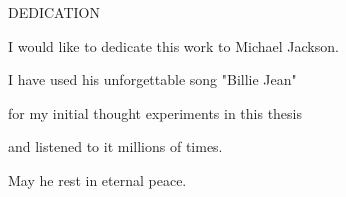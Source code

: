 \newpage
{}

\begin{center}
DEDICATION
\end{center}

\begin{center}
I would like to dedicate this work to Michael Jackson.

\bigskip

I have used his unforgettable song "Billie Jean"

for my initial thought experiments in this thesis

and listened to it millions of times.

\bigskip

May he rest in eternal peace.
\end{center}

